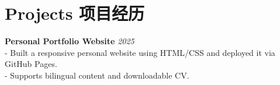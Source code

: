 \section*{ Projects 项目经历}

\textbf{Personal Portfolio Website} \hfill \textit{2025} \\
- Built a responsive personal website using HTML/CSS and deployed it via GitHub Pages. \\
- Supports bilingual content and downloadable CV.

